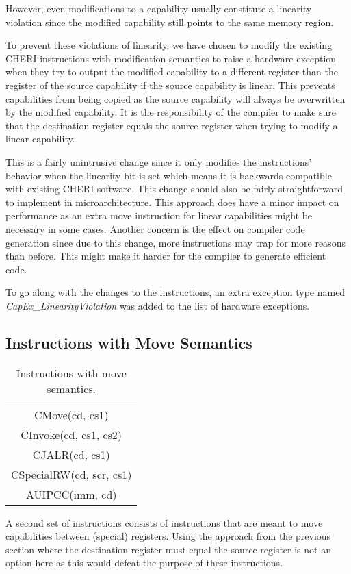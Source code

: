 However, even modifications to a capability usually constitute a linearity violation since the modified capability still points to the same memory region.

To prevent these violations of linearity, we have chosen to modify the existing CHERI instructions with modification semantics to raise a hardware exception when they try to output the modified capability to a different register than the register of the source capability if the source capability is linear. This prevents capabilities from being copied as the source capability will always be overwritten by the modified capability. It is the responsibility of the compiler to make sure that the destination register equals the source register when trying to modify a linear capability.

This is a fairly unintrusive change since it only modifies the instructions' behavior when the linearity bit is set which means it is backwards compatible with existing CHERI software. This change should also be fairly straightforward to implement in microarchitecture. This approach does have a minor impact on performance as an extra move instruction for linear capabilities might be necessary in some cases. Another concern is the effect on compiler code generation since due to this change, more instructions may trap for more reasons than before. This might make it harder for the compiler to generate efficient code.

To go along with the changes to the instructions, an extra exception type named \textit{CapEx\_LinearityViolation} was added to the list of hardware exceptions.

\subsection{Instructions with Move Semantics}
\begin{table}[h]
\centering
\begin{tabular}{| c |}
\hline
 CMove(cd, cs1) \\
 CInvoke(cd, cs1, cs2) \\
 CJALR(cd, cs1) \\
 CSpecialRW(cd, scr, cs1) \\
 AUIPCC(imm, cd) \\
\hline
\end{tabular}
\caption{Instructions with move semantics.}
\label{table:lininstmove}
\end{table}

A second set of instructions consists of instructions that are meant to move capabilities between (special) registers. Using the approach from the previous section where the destination register must equal the source register is not an option here as this would defeat the purpose of these instructions.

